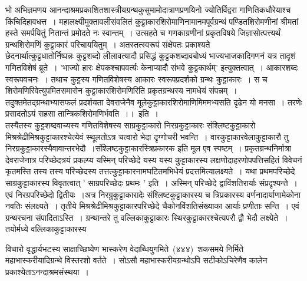 \documentclass[11pt, openany]{book}
\begin{document}
\newpage
\thispagestyle{fancy}
\fancyhf{}

\justifying

\indent
भो अभिज्ञमणय आनन्दाश्रमप्रकाशितशास्त्रीयग्रन्थकुसुमामोदात्राणप्रणयिनो ज्योतिर्विद्वरा गाणितिकधौरेयाश्च किंचिदिहावधत्त~। महालक्ष्यीमुक्तावलीसंवलितं कुट्टाकारशिरोमाणिनामानमपूर्वग्रन्थं पण्डितशिरोमणीनां श्रीमतां हस्ते समर्पयितुं नितान्तं प्रमोदते नः स्वान्तम्~। उत्सहते च गणकाग्रणीनां प्रकृतविषये जिज्ञासोत्पत्त्यर्थं ग्रन्थशिरोमणिं कुट्टाकारं परिचाययितुम्~। अतस्तत्स्वरूपं संक्षेपतः प्रकाश्यते \textendash\\

\indent
छेदनार्थात्कुट्टधातोर्निष्पन्नः कुट्टशब्दो लीलावत्यादौ प्रसिद्धं कुट्टकशब्दावबोध्यं भाज्यभाजकादिगणनं यत्र तादृशं गणितविशेषं ब्रूते~। 'भाज्यो हारः क्षेपकश्चापवर्त्यः केनाप्यादौ संभवे कुट्टकार्थम्' इत्युक्तत्वात्~। आकारशब्दः स्वरूपवचनः~। तथाच कुट्टस्य गणितविशेषस्य आकारः स्वरूपप्रदर्शको ग्रन्थः कुट्टाकारः~। स च शिरोमणिरिवेत्युपमितसमासेन कुट्टाकारशिरोमणिरिति प्रकृतग्रन्थस्य नामधेयं संपन्नम्~। तदुक्तमेतद्ग्रन्थाभ्यासफलं प्रदर्शयता देवराजेनैव मूले\textendash  कुट्टाकारशिरोमाणिमिममभ्यसति दृढेन यो मनसा~। तरणेः प्रसादतोऽयं सहसा तान्त्रिकशिरोमणिर्भवति~।।~इति~।\\

\indent
तस्यैतस्य कुट्टशब्दवाच्यस्य गणितविशेषस्य साग्रकुट्टाकारो निरग्रकुट्टाकारः संश्लिष्टकुट्टाकारो मिश्रश्रेढीमिश्रकुट्टाकारश्चेत्येवं स्थूलतोऽत्र चत्वारो भेदा दृग्गोचरी भवन्ति~। वारकुट्टाकारवेलाकुट्टाकारौ तु निरग्रकुट्टाकारस्यैवावान्तरभेदौ~।संश्लिष्टकुट्टाकारस्त्रिप्रकारक इति मूल एव स्पष्टम्~। प्रकृतग्रन्थनिर्मात्रा देवराजेनात्र परिच्छेदत्रयं प्रकल्प्य यस्मिन् परिच्छेदे यस्य यस्य कुट्टाकारस्य लक्षणोदाहरणोपपत्तिसहितं विवेचनं कृतमस्ति तस्य तस्य परिच्छेदस्य तत्तत्कुट्टाकारनामघटितमभिधेयं प्रदत्तमित्यालक्ष्यते~। यथा प्रथमपरिच्छेदे साग्रकुट्टाकारस्य विवृतत्वात् ' साग्रपरिच्छेदः प्रथमः ' इति~। अस्मिन् परिच्छेदे द्वाविंशतिरार्याः संप्रदृश्यन्ते~। एवं निरग्रपरिच्छेदो द्वितीयः~।अत्र निरग्रुकुट्टाकारादेः संश्लिष्टकुट्टाकारस्य च त्रिप्रकारस्य वर्णनादार्याणामेकोना नवतिः संलक्ष्यते~। तृतीये मिश्रश्रेढीमिश्रकुट्टाकारपरिच्छेदे चैकोनविंशतिसंख्याका आर्याः प्रणीताः सन्ति~। एवं ग्रन्थरचना संपादिताऽस्ति~। ग्रन्थान्तरे तु वल्लिकाकुट्टाकारः स्थिरकुट्टाकारश्चेत्यपरौ द्वौ भेदौ लक्ष्येते~। तयोर्मध्ये वल्लिकाकुट्टाकारस्य

\newpage
\thispagestyle{fancy}
\fancyhf{}
\chead{\textbf{[२]}}

\noindent
विचारो वृद्धार्यभटस्य साक्षाच्छिष्येण भास्करेण वेदाब्धियुगमिते~(४४४)~शकसमये निर्मिते महाभास्करीयादिग्रन्थे विस्तरशो वर्तते~। सोऽसौ महाभास्करीयग्रन्थोऽपि सटीकोऽचिरेणैव कालेन प्रकाश्येताऽनन्दाश्रमसंस्थया~।\\
\end{document}
